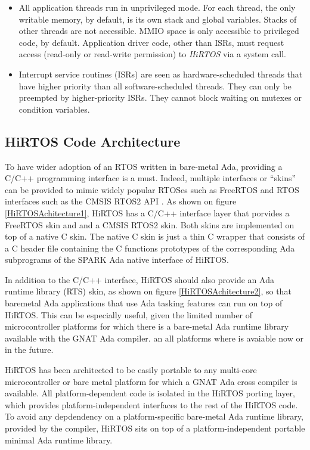 \documentclass{AUJarticle}
\begin{document}
\begin{itemize}
\item
All application threads run in unprivileged mode. For each thread, the only writable memory,
by default, is its own stack and global variables. Stacks of other threads are not accessible.
MMIO space is only accessible to privileged code, by default. Application driver code, other
than ISRs, must request access (read-only or read-write permission) to \emph{HiRTOS} via a
system call.

\item Interrupt service routines (ISRs) are seen as hardware-scheduled threads that have higher priority than all
software-scheduled threads. They can only be preempted by higher-priority ISRs.
They cannot block waiting on mutexes or condition variables.
\end{itemize}

\subsection{HiRTOS Code Architecture}

To have wider adoption of an RTOS written in bare-metal Ada, providing a C/C++ programming interface
is a must. Indeed, multiple interfaces or ``skins'' can be provided to mimic widely popular
RTOSes such as FreeRTOS \cite{freeRTOS} and RTOS interfaces such as the CMSIS RTOS2 API \cite{cmsisRTOS}.
As shown on figure \ref{HiRTOSAchitecture1}, HiRTOS has a C/C++ interface layer that porvides
a FreeRTOS skin and and a CMSIS RTOS2 skin. Both skins are implemented on top of a native C skin.
The native C skin is just a thin C wrapper that consists of a C header file containing the C
functions prototypes of the corresponding Ada subprograms of the SPARK Ada native interface of HiRTOS.

In addition to the C/C++ interface, HiRTOS should also provide an Ada runtime library (RTS) skin,
as shown on figure \ref{HiRTOSAchitecture2}, so that baremetal Ada applications that use Ada tasking
features can run on top of HiRTOS. This can be especially useful, given the limited number of
microcontroller platforms for which there is a bare-metal Ada runtime library available with the
GNAT Ada compiler. an all platforms where is avaiable now or in the future.

HiRTOS has been architected to be easily portable to any multi-core microcontroller or bare metal
platform for which a GNAT Ada cross compiler is available. All platform-dependent code is isolated in the
HiRTOS porting layer, which provides platform-independent interfaces to the rest of the HiRTOS code.
To avoid any depdendency on a platform-specific bare-metal Ada runtime library, provided by the
compiler, HiRTOS sits on top of a platform-independent portable minimal Ada runtime library.
\end{document}
